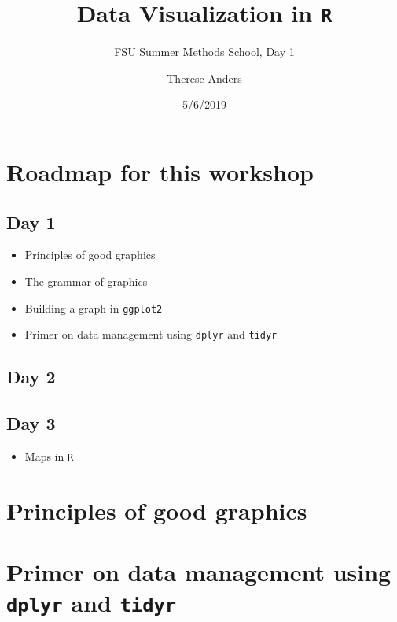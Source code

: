 \documentclass[]{article}
\title{Data Visualization in \texttt{R}}
\subtitle{FSU Summer Methods School, Day 1}
\author{Therese Anders}
\date{5/6/2019}
\providecommand{\tightlist}{%
  \setlength{\itemsep}{0pt}\setlength{\parskip}{0pt}}
\begin{document}
\maketitle

\hypertarget{roadmap-for-this-workshop}{%
\section{Roadmap for this workshop}\label{roadmap-for-this-workshop}}

\hypertarget{day-1}{%
\subsection{Day 1}\label{day-1}}

\begin{itemize}
\tightlist
\item
  Principles of good graphics
\item
  The grammar of graphics
\item
  Building a graph in \texttt{ggplot2}
\item
  Primer on data management using \texttt{dplyr} and \texttt{tidyr}
\end{itemize}

\hypertarget{day-2}{%
\subsection{Day 2}\label{day-2}}

\hypertarget{day-3}{%
\subsection{Day 3}\label{day-3}}

\begin{itemize}
\tightlist
\item
  Maps in \texttt{R}
\end{itemize}

\hypertarget{principles-of-good-graphics}{%
\section{Principles of good
graphics}\label{principles-of-good-graphics}}

\hypertarget{primer-on-data-management-using-dplyr-and-tidyr}{%
\section{\texorpdfstring{Primer on data management using \texttt{dplyr}
and
\texttt{tidyr}}{Primer on data management using dplyr and tidyr}}\label{primer-on-data-management-using-dplyr-and-tidyr}}
\end{document}
